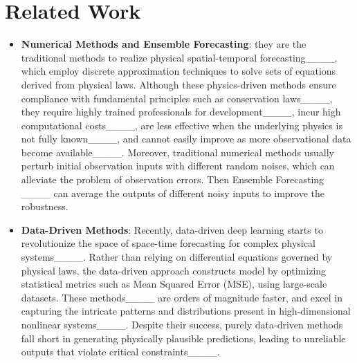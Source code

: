 \section{Related Work}
\label{sec:related_work}
\begin{itemize}
    \item \textbf{Numerical Methods and Ensemble Forecasting}: they are the traditional methods to realize physical spatial-temporal forecasting____, which employ discrete approximation techniques to solve sets of equations derived from physical laws. Although these physics-driven methods ensure compliance with fundamental principles such as conservation laws____, they require highly trained professionals for development____, incur high computational costs____, are less effective when the underlying physics is not fully known____, and cannot easily improve as more observational data become available____.
    Moreover, traditional numerical methods usually perturb initial observation inputs with different random noises, which can alleviate the problem of observation errors.  
    Then Ensemble Forecasting ____ can average the outputs of different noisy inputs to improve the robustness.
    
    \item \textbf{Data-Driven Methods}: Recently, data-driven deep learning starts to revolutionize the space of space-time forecasting for complex physical systems____. Rather than relying on differential equations governed by physical laws, the data-driven approach constructs model by optimizing statistical metrics such as Mean Squared Error (MSE), using large-scale datasets. These methods____ are orders of magnitude faster, and excel in capturing the intricate patterns and distributions present in high-dimensional nonlinear systems____. Despite their success, purely data-driven methods fall short in generating physically plausible predictions, leading to unreliable outputs that violate critical constraints____.


\end{itemize}
